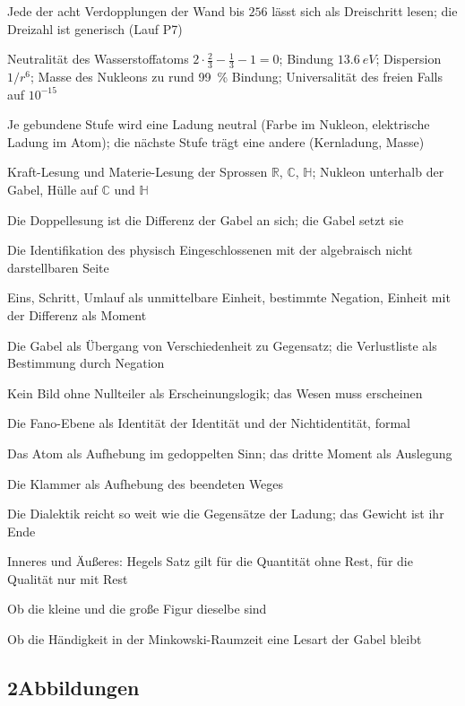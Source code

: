 \documentclass[11pt,a4paper]{article}
\newcommand{\R}{\mathbb R}
\newcommand{\C}{\mathbb C}
\newcommand{\HH}{\mathbb H}
\begin{document}
\begin{description}[itemsep=1pt,font=\normalfont\bfseries]
\item[Satz:] Jede der acht Verdopplungen der Wand bis $256$ lässt sich als Dreischritt lesen; die Dreizahl ist generisch (Lauf P7)
\item[Befund:] Neutralität des Wasserstoffatoms $2\cdot\tfrac23-\tfrac13-1=0$; Bindung $\SI{13.6}{eV}$; Dispersion $1/r^6$; Masse des Nukleons zu rund \SI{99}{\percent} Bindung; Universalität des freien Falls auf $10^{-15}$
\item[Befund:] Je gebundene Stufe wird eine Ladung neutral (Farbe im Nukleon, elektrische Ladung im Atom); die nächste Stufe trägt eine andere (Kernladung, Masse)
\item[These:] Kraft-Lesung und Materie-Lesung der Sprossen $\R$, $\C$, $\HH$; Nukleon unterhalb der Gabel, Hülle auf $\C$ und $\HH$
\item[These:] Die Doppellesung ist die Differenz der Gabel an sich; die Gabel setzt sie
\item[These:] Die Identifikation des physisch Eingeschlossenen mit der algebraisch nicht darstellbaren Seite
\item[Deutung:] Eins, Schritt, Umlauf als unmittelbare Einheit, bestimmte Negation, Einheit mit der Differenz als Moment
\item[Deutung:] Die Gabel als Übergang von Verschiedenheit zu Gegensatz; die Verlustliste als Bestimmung durch Negation
\item[Deutung:] Kein Bild ohne Nullteiler als Erscheinungslogik; das Wesen muss erscheinen
\item[Deutung:] Die Fano-Ebene als Identität der Identität und der Nichtidentität, formal
\item[Deutung:] Das Atom als Aufhebung im gedoppelten Sinn; das dritte Moment als Auslegung
\item[Deutung:] Die Klammer als Aufhebung des beendeten Weges
\item[Deutung:] Die Dialektik reicht so weit wie die Gegensätze der Ladung; das Gewicht ist ihr Ende
\item[Deutung:] Inneres und Äußeres: Hegels Satz gilt für die Quantität ohne Rest, für die Qualität nur mit Rest
\item[Offen:] Ob die kleine und die große Figur dieselbe sind
\item[Offen:] Ob die Händigkeit in der Minkowski-Raumzeit eine Lesart der Gabel bleibt
\end{description}

\subsection*{2\quad Abbildungen}
\end{document}
